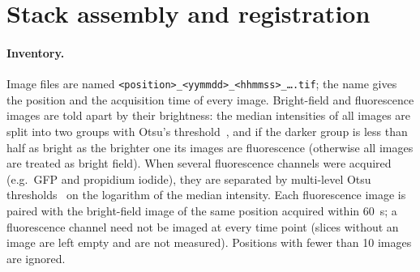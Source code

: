 \documentclass[11pt,a4paper]{article}
\begin{document}
\section{Stack assembly and registration}\label{sec:stacks}

\paragraph{Inventory.} Image files are named \texttt{<position>\_<yymmdd>\_<hhmmss>\_\ldots.tif}; the name gives the position and the acquisition time of every image. Bright-field and fluorescence images are told apart by their brightness: the median intensities of all images are split into two groups with Otsu's threshold~\cite{otsu1979}, and if the darker group is less than half as bright as the brighter one its images are fluorescence (otherwise all images are treated as bright field). When several fluorescence channels were acquired (e.g.\ GFP and propidium iodide), they are separated by multi-level Otsu thresholds~\cite{liao2001} on the logarithm of the median intensity. Each fluorescence image is paired with the bright-field image of the same position acquired within \SI{60}{\second}; a fluorescence channel need not be imaged at every time point (slices without an image are left empty and are not measured). Positions with fewer than 10 images are ignored.
\end{document}
